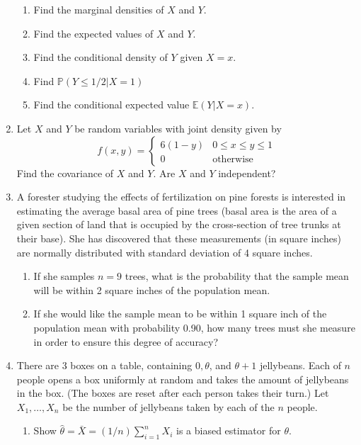 \documentclass[12pt]{article}
\def\P{{\mathbb P}}
\def\E{{\mathbb E}}
\begin{document}
\begin{enumerate}
\begin{enumerate}
\item Find the marginal densities of $X$ and $Y$.

\item Find the expected values of $X$ and $Y$.

\item Find the conditional density of $Y$ given $X = x$.

\item Find $\P(Y \leq  1/2 | X = 1)$

\item Find the conditional expected value $\E(Y|X = x)$.
\end{enumerate}

\item Let $X$ and $Y$ be random variables with joint density given by
\[
f(x, y) = \begin{cases}
6(1-y) & 0 \leq x \leq y \leq 1\\
0 & \text{otherwise}
\end{cases}
\]
Find the covariance of $X$ and $Y$. Are $X$ and $Y$ independent?

\item A forester studying the effects of fertilization on pine forests is interested in estimating the average basal area of pine trees (basal area is the area of a given section of land that is occupied by the cross-section of tree trunks at their base). She has discovered that these measurements (in square inches) are normally distributed with standard deviation of 4 square inches.
\begin{enumerate}
\item If she samples $n = 9$ trees, what is the probability that the sample mean will be within 2 square inches of the population mean.

\item If she would like the sample mean to be within 1 square inch of the population mean with probability 0.90, how many trees must she measure in order to ensure this degree of accuracy?
\end{enumerate}

\item There are 3 boxes on a table, containing $0, \theta$, and $\theta+1$ jellybeans.  Each of $n$ people opens a box uniformly at random and takes the amount of jellybeans in the box. (The boxes are reset after each person takes their turn.) Let $X_1, \dots, X_n$ be the number of jellybeans taken by each of the $n$ people.
\begin{enumerate}
\item Show $\hat{\theta} = \bar{X} = (1/n) \sum_{i=1}^n X_i$ is a biased estimator for $\theta$. 


\end{enumerate}
\end{enumerate}
\end{document}
